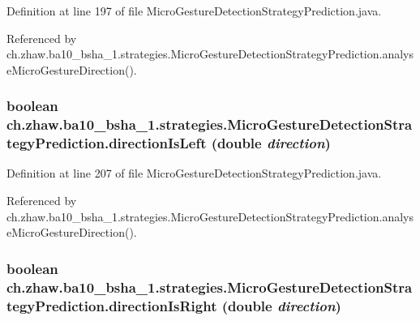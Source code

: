 Definition at line 197 of file MicroGestureDetectionStrategyPrediction.java.

Referenced by ch.zhaw.ba10\_\-bsha\_\-1.strategies.MicroGestureDetectionStrategyPrediction.analyseMicroGestureDirection().\hypertarget{classch_1_1zhaw_1_1ba10__bsha__1_1_1strategies_1_1MicroGestureDetectionStrategyPrediction_aab16f8d6aa8dbf56c71b04e299ae190a}{
\subsubsection[{directionIsLeft}]{\setlength{\rightskip}{0pt plus 5cm}boolean ch.zhaw.ba10\_\-bsha\_\-1.strategies.MicroGestureDetectionStrategyPrediction.directionIsLeft (double {\em direction})}}
\label{classch_1_1zhaw_1_1ba10__bsha__1_1_1strategies_1_1MicroGestureDetectionStrategyPrediction_aab16f8d6aa8dbf56c71b04e299ae190a}


Definition at line 207 of file MicroGestureDetectionStrategyPrediction.java.

Referenced by ch.zhaw.ba10\_\-bsha\_\-1.strategies.MicroGestureDetectionStrategyPrediction.analyseMicroGestureDirection().\hypertarget{classch_1_1zhaw_1_1ba10__bsha__1_1_1strategies_1_1MicroGestureDetectionStrategyPrediction_a41a97838c8b39eff1e6b50de7ca85d2e}{
\subsubsection[{directionIsRight}]{\setlength{\rightskip}{0pt plus 5cm}boolean ch.zhaw.ba10\_\-bsha\_\-1.strategies.MicroGestureDetectionStrategyPrediction.directionIsRight (double {\em direction})}}
\label{classch_1_1zhaw_1_1ba10__bsha__1_1_1strategies_1_1MicroGestureDetectionStrategyPrediction_a41a97838c8b39eff1e6b50de7ca85d2e}


